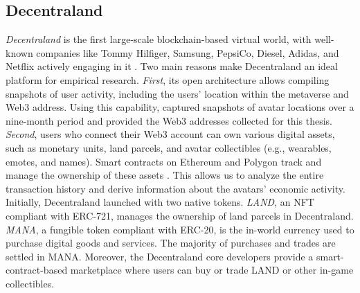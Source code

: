 \documentclass[12pt,a4paper,titlepage,oneside,english]{article}
\begin{document}
\subsection{Decentraland}
\textit{Decentraland} is the first large-scale blockchain-based virtual world, with well-known companies like Tommy Hilfiger, Samsung, PepsiCo, Diesel, Adidas, and Netflix actively engaging in it \citep{metaverse-retailing2023}.\newline
Two main reasons make Decentraland an ideal platform for empirical research.
\textit{First}, its open architecture allows compiling snapshots of user activity, including the users' location within the metaverse and Web3 address. Using this capability, \cite{metaverse-retailing2023} captured snapshots of avatar locations over a nine-month period and provided the Web3 addresses collected for this thesis.\newline
\textit{Second}, users who connect their Web3 account can own various digital assets, such as monetary units, land parcels, and avatar collectibles (e.g., wearables, emotes, and names). Smart contracts on Ethereum and Polygon track and manage the ownership of these assets \citep{goldbergschaer2023}. This allows us to analyze the entire transaction history and derive information about the avatars' economic activity. \newline
Initially, Decentraland launched with two native tokens. \textit{LAND}, an NFT compliant with ERC-721, manages the ownership of land parcels in Decentraland. \textit{MANA}, a fungible token compliant with ERC-20, is the in-world currency used to purchase digital goods and services. The majority of purchases and trades are settled in MANA. \newline 
Moreover, the Decentraland core developers provide a smart-contract-based marketplace where users can buy or trade LAND or other in-game collectibles.
 
\end{document}

